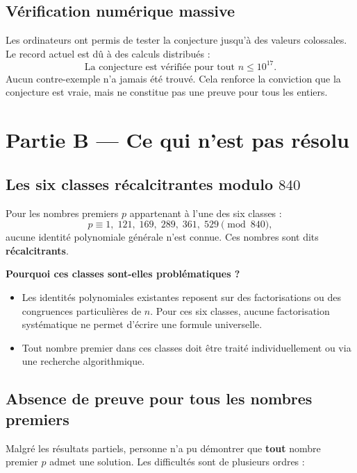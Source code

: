 \documentclass[12pt,a4paper]{article}
\begin{document}
\subsection{Vérification numérique massive}

Les ordinateurs ont permis de tester la conjecture jusqu'à des valeurs colossales. Le record actuel est dû à des calculs distribués :
\[
\text{La conjecture est vérifiée pour tout } n \le 10^{17}.
\]
Aucun contre-exemple n'a jamais été trouvé. Cela renforce la conviction que la conjecture est vraie, mais ne constitue pas une preuve pour tous les entiers.

\section{Partie B --- Ce qui n'est pas résolu}

\subsection{Les six classes récalcitrantes modulo $840$}

Pour les nombres premiers $p$ appartenant à l'une des six classes :
\[
p \equiv 1,\; 121,\; 169,\; 289,\; 361,\; 529 \pmod{840},
\]
aucune identité polynomiale générale n'est connue. Ces nombres sont dits \textbf{récalcitrants}.

\medskip
\textbf{Pourquoi ces classes sont-elles problématiques ?}
\begin{itemize}
    \item Les identités polynomiales existantes reposent sur des factorisations ou des congruences particulières de $n$. Pour ces six classes, aucune factorisation systématique ne permet d'écrire une formule universelle.
    \item Tout nombre premier dans ces classes doit être traité individuellement ou via une recherche algorithmique.
\end{itemize}

\subsection{Absence de preuve pour tous les nombres premiers}

Malgré les résultats partiels, personne n'a pu démontrer que \textbf{tout} nombre premier $p$ admet une solution. Les difficultés sont de plusieurs ordres :
\end{document}
